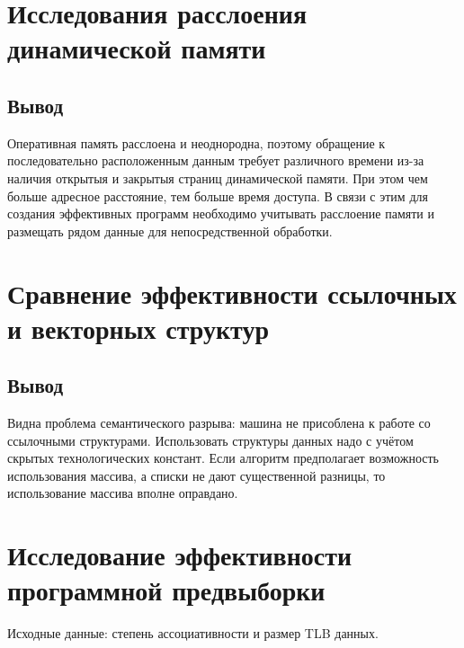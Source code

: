 
\chapter*{Исследования расслоения динамической памяти}


 

\section*{Вывод}
 Оперативная память расслоена и неоднородна, поэтому обращение к последовательно расположенным данным требует различного времени из-за наличия открытыя и закрытыя  страниц динамической памяти. При этом чем больше адресное расстояние, тем больше время доступа. В связи с этим для создания эффективных программ необходимо учитывать расслоение памяти и размещать рядом данные для непосредственной обработки.



\chapter*{Сравнение эффективности ссылочных и векторных структур}



\section*{Вывод}
 Видна проблема семантического разрыва: машина не присоблена к работе со ссылочными структурами. Использовать структуры данных надо с учётом скрытых технологических констант. Если алгоритм предполагает возможность использования массива, а списки не дают существенной разницы, то использование массива вполне оправдано.



\chapter*{Исследование эффективности программной предвыборки}

Исходные данные: степень ассоциативности и размер TLB данных.





